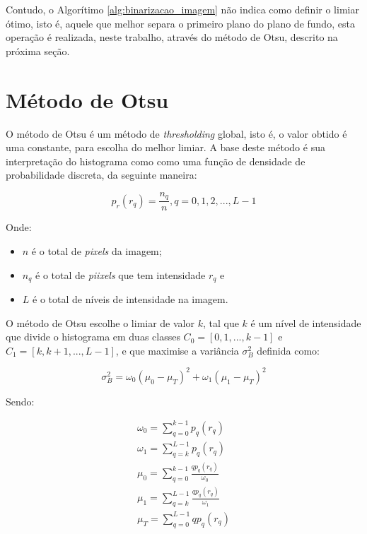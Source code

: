 Contudo, o Algorítimo \ref{alg:binarizacao_imagem} não indica como definir o limiar
ótimo, isto é, aquele que melhor separa o primeiro plano do plano de fundo, esta
operação é realizada, neste trabalho, através do método de Otsu, descrito na próxima seção.

\section{Método de Otsu}\label{sec:metodo_otsu}

O método de Otsu é um método de \textit{thresholding} global, isto é, o valor obtido é
uma constante, para escolha do melhor limiar. A base deste método é sua interpretação
do histograma como como uma função de densidade de probabilidade
discreta, da seguinte maneira:

\begin{equation}\label{eq:histograma_norm}
  p_r(r_q) = \frac{n_q}{n}, q = 0, 1, 2, ..., L-1
\end{equation}

Onde:

\begin{itemize}
  \item $ n $ é o total de \textit{pixels} da imagem;
  \item $ n_q $ é o total de \textit{piixels} que tem intensidade $ r_q $ e
  \item $ L $ é o total de níveis de intensidade na imagem.
\end{itemize}

O método de Otsu escolhe o limiar de valor $ k $, tal que $ k $ é um nível de
intensidade que divide o histograma em duas classes
$ C_0 = [0, 1, ..., k-1] $ e $ C_1 = [k, k+1, ..., L-1] $, e que maximise a
variância $ \sigma_{B}^2 $ definida como:

\begin{equation}\label{eq:maximizacao_variancia}
  \sigma_{B}^2 = \omega_0(\mu_0 - \mu_T)^2 + \omega_1(\mu_1 - \mu_T)^2
\end{equation}

Sendo:

\begin{subequations}\label{eq:somatorios_maximizacao}
\begin{align}
  \omega_0 = \sum_{q=0}^{k-1} p_q(r_q)\\
  \omega_1 = \sum_{q=k}^{L-1} p_q(r_q)\\
     \mu_0 = \sum_{q=0}^{k-1} \frac{qp_q(r_q)}{\omega_0}\\
     \mu_1 = \sum_{q=k}^{L-1} \frac{qp_q(r_q)}{\omega_1}\\
     \mu_T = \sum_{q=0}^{L-1} qp_q(r_q)
\end{align}
\end{subequations}

